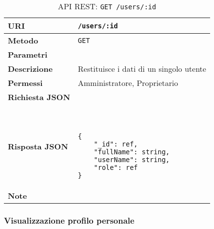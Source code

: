         \begin{table}[H]
            \begin{center}
                \begin{tabular}{p{} p{}}
                    \toprule
                    \textbf{URI} & \texttt{/users/:id} \\ \midrule
                    \textbf{Metodo} & \texttt{GET} \\ \midrule
                    \textbf{Parametri} & \\ \midrule
                    \textbf{Descrizione} & Restituisce i dati di un singolo utente \\ \midrule
                    \textbf{Permessi} & Amministratore, Proprietario  \\ \midrule
                    \textbf{Richiesta JSON} & \\ \midrule
                    \textbf{Risposta JSON} & \
                        \begin{lstlisting}[basicstyle={\ttfamily}]
{
    "_id": ref,
    "fullName": string,
    "userName": string,
    "role": ref
}
                        \end{lstlisting}
                        \\ \midrule
                    \textbf{Note} & \\
                    \bottomrule
                \end{tabular}
                \caption{API REST: \texttt{GET /users/:id}}
            \end{center}
        \end{table}

    \subsubsection{Visualizzazione profilo personale}

